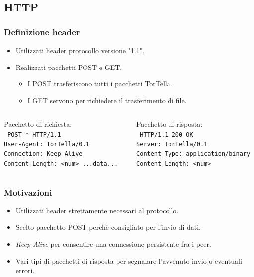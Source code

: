 \documentclass[a4paper,italian,12pt]{beamer}
\begin{document}
		\subsection{HTTP}
			\begin{frame}
				\frametitle{Definizione header}
				\begin{itemize}
					\item Utilizzati header protocollo versione "1.1".
					\item Realizzati pacchetti POST e GET.
					\begin{itemize}
						\item I POST trasferiscono tutti i pacchetti TorTella.
						\item I GET servono per richiedere il trasferimento di file.
					\end{itemize}
				\end{itemize}
				\vspace{2mm}
				\begin{columns}
					\footnotesize{
					\begin{column}{0.5\textwidth}			
						Pacchetto di richiesta:\\
						\texttt{					
							POST * HTTP/1.1\\
							User-Agent: TorTella/0.1\\
							Connection: Keep-Alive\\
							Content-Length: <num>
							...data...
						}
					\end{column}
					\begin{column}{0.5\textwidth}
						Pacchetto di risposta:\\
						\vspace{2mm}
						\texttt{					
							HTTP/1.1 200 OK\\
							Server: TorTella/0.1\\
							Content-Type: application/binary\\
							Content-Length: <num>
						}
					\end{column}
					}
				\end{columns}
			\end{frame}
			
			\begin{frame}
				\frametitle{Motivazioni}
				\begin{itemize}
					\item Utilizzati header strettamente necessari al protocollo.
					\item Scelto pacchetto POST perchè consigliato per l'invio di dati.
					\item \textit{Keep-Alive} per consentire una connessione persistente fra i peer.
					\item Vari tipi di pacchetti di risposta per segnalare l'avvenuto invio o eventuali errori.
				\end{itemize}
			\end{frame}
\end{document}
